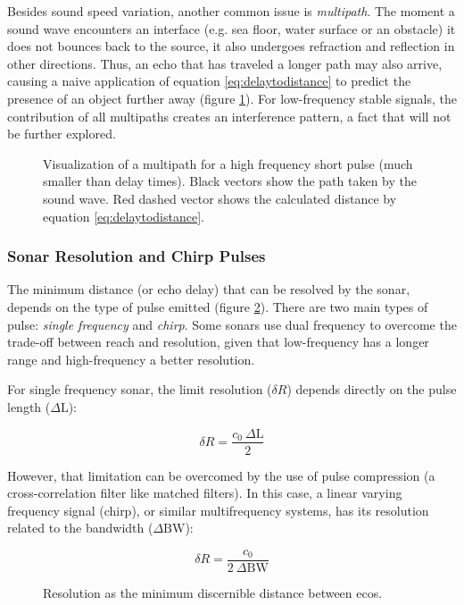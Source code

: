 Besides sound speed variation, another common issue is \textit{multipath}. The
moment a sound wave encounters an interface (e.g. sea floor, water surface or an
obstacle) it does not bounces back to the source, it also undergoes refraction
and reflection in other directions. Thus, an echo that has traveled a longer
path may also arrive, causing a naive application of equation \ref{eq:delaytodistance} to
predict the presence of an object further away (figure \ref{fig:multipath}). For
low-frequency stable signals, the contribution of all multipaths creates an
interference pattern\cite{LURTON}, a fact that will not be further explored. 

\begin{figure}
	\centering
	
	\caption{Visualization of a multipath for a high frequency short pulse (much
	smaller than delay times). Black vectors show the path taken by the sound
	wave. Red dashed vector shows the calculated distance by equation
	\ref{eq:delaytodistance}.}
	\label{fig:multipath}
\end{figure}

\subsubsection{Sonar Resolution and Chirp Pulses}

The minimum distance (or echo delay) that can be resolved by the sonar, depends
on the type of pulse emitted (figure \ref{fig:chirpresolution}). There are two
main types of pulse:
\textit{single frequency} and \textit{chirp}\cite{chirp,gaussianchirp}. Some
sonars use dual frequency to overcome the trade-off between reach and
resolution, given that low-frequency has a longer range and high-frequency a better resolution.

For single frequency sonar, the limit resolution ($\delta R$) depends directly
on the pulse length ($\Delta\text{L}$):

\[ \delta R = \frac{c_0~\Delta\text{L}}{2} \] 

However, that limitation can be overcomed by the use of pulse compression (a
cross-correlation filter like matched filters). In this case, a linear varying
frequency signal (chirp), or similar multifrequency systems, has its resolution
related to the bandwidth ($\Delta \text{BW}$):

\[ \delta R = \frac{c_0}{2~\Delta \text{BW}} \]

\begin{figure}
	\centering
	
	\caption{Resolution as the minimum discernible distance between ecos.}
	\label{fig:chirpresolution}
\end{figure}

